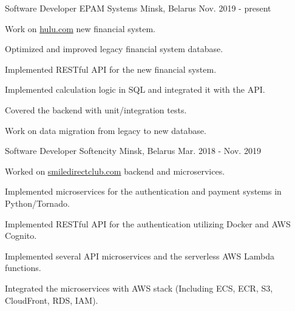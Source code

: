 

\begin{cventries}
  \cventry
    {Software Developer} %
    {EPAM Systems} %
    {Minsk, Belarus} %
    {Nov. 2019 - present} %
    {
      \begin{cvitems} %
        \item {Work on \href{www.hulu.com}{hulu.com} new financial system.}
        \item {Optimized and improved legacy financial system database.}
        \item {Implemented RESTful API for the new financial system.}
        \item {Implemented calculation logic in SQL and integrated it with the API.}
        \item {Covered the backend with unit/integration tests.}
        \item {Work on data migration from legacy to new database.}
      \end{cvitems}
    }

  \cventry
    {Software Developer} %
    {Softencity} %
    {Minsk, Belarus} %
    {Mar. 2018 - Nov. 2019} %
    {
      \begin{cvitems} %
        \item {Worked on \href{www.smiledirectclub.com}{smiledirectclub.com} backend and microservices.}
        \item {Implemented microservices for the authentication and payment systems in Python/Tornado.}
        \item {Implemented RESTful API for the authentication utilizing Docker and AWS Cognito.}
        \item {Implemented several API microservices and the serverless AWS Lambda functions.}
        \item {Integrated the microservices with AWS stack (Including ECS, ECR, S3, CloudFront, RDS, IAM).}
      \end{cvitems}
    }


\end{cventries}
